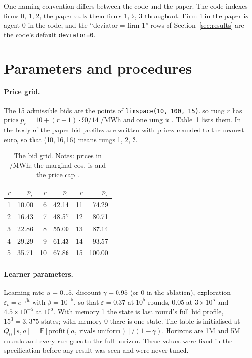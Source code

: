 One naming convention differs between the code and the paper. The code indexes firms 0, 1, 2; the paper calls them firms 1, 2, 3 throughout. Firm 1 in the paper is agent 0 in the code, and the ``deviator = firm 1'' rows of Section~\ref{sec:results} are the code's default \texttt{deviator=0}.

\section{Parameters and procedures}\label{app:params}

\paragraph{Price grid.} The 15 admissible bids are the points of \texttt{linspace(10, 100, 15)}, so rung $r$ has price $p_r = 10 + (r-1)\cdot 90/14$ \texteuro/MWh and one rung is . Table~\ref{tab:app-grid} lists them. In the body of the paper bid profiles are written with prices rounded to the nearest euro, so that (10,\,16,\,16) means rungs 1, 2, 2.

\begin{table}[htbp]
\centering
\caption{The bid grid. Notes: prices in \texteuro/MWh; the marginal cost is  and the price cap .}
\label{tab:app-grid}
\begin{tabular}{rr@{\qquad}rr@{\qquad}rr}
\toprule
$r$ & $p_r$ & $r$ & $p_r$ & $r$ & $p_r$ \\
\midrule
1 & 10.00 & 6 & 42.14 & 11 & 74.29 \\
2 & 16.43 & 7 & 48.57 & 12 & 80.71 \\
3 & 22.86 & 8 & 55.00 & 13 & 87.14 \\
4 & 29.29 & 9 & 61.43 & 14 & 93.57 \\
5 & 35.71 & 10 & 67.86 & 15 & 100.00 \\
\bottomrule
\end{tabular}
\end{table}

\paragraph{Learner parameters.} Learning rate $\alpha = 0.15$, discount $\gamma = 0.95$ (or 0 in the ablation), exploration $\varepsilon_t = e^{-\beta t}$ with $\beta = 10^{-5}$, so that $\varepsilon = 0.37$ at $10^5$ rounds, $0.05$ at $3\times 10^5$ and $4.5\times 10^{-5}$ at $10^6$. With memory 1 the state is last round's full bid profile, $15^3 = 3{,}375$ states; with memory 0 there is one state. The table is initialised at $Q_0[s,a] = \mathbb{E}[\text{profit}(a,\ \text{rivals uniform})]/(1-\gamma)$. Horizons are 1M and 5M rounds and every run goes to the full horizon. These values were fixed in the specification before any result was seen and were never tuned.

